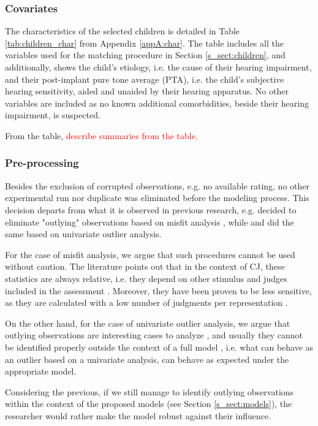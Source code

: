 \subsubsection{Covariates} \label{ss_sect:covariates}
%
The characteristics of the selected children is detailed in Table \ref{tab:children_char} from Appendix \ref{appA:char}. The table includes all the variables used for the matching procedure in Section \ref{s_sect:children}, and additionally, shows the child's etiology, i.e. the cause of their hearing impairment, and their post-implant pure tone average (PTA), i.e. the child's subjective hearing sensitivity, aided and unaided by their hearing apparatus. No other variables are included as no known additional comorbidities, beside their hearing impairment, is suspected.

From the table, \textcolor{red}{describe summaries from the table.}
%
%
\subsubsection{Pre-processing} \label{ss_sect:preproc}
%
Besides the exclusion of corrupted observations, e.g. no available rating, no other experimental run nor duplicate was eliminated before the modeling process. This decision departs from what it is observed in previous research, e.g. \citet{Boonen_et_al_2020} decided to eliminate "outlying" observations based on misfit analysis \citep{Lesterhuis_2018}, while \citet{vanDaal_2020} and \citet{Boonen_et_al_2021} did the same based on univariate outlier analysis. 

For the case of misfit analysis, we argue that such procedures cannot be used without caution. The literature points out that in the context of CJ, these statistics are always relative, i.e. they depend on other stimulus and judges included in the assessment \citep{Pollitt_2012a, Pollitt_2012b}. Moreover, they have been proven to be less sensitive, as they are calculated with a low number of judgments per representation \citep{Pollitt_2012a}. 

On the other hand, for the case of univariate outlier analysis, we argue that outlying observations are interesting cases to analyze \citep{McElreath_2020}, and usually they cannot be identified properly outside the context of a full model \citep{McElreath_2020}, i.e. what can behave as an outlier based on a univariate analysis, can behave as expected under the appropriate model. 

Considering the previous, if we still manage to identify outlying observations within the context of the proposed models (see Section \ref{s_sect:models}), the researcher would rather make the model robust against their influence.
%
%
